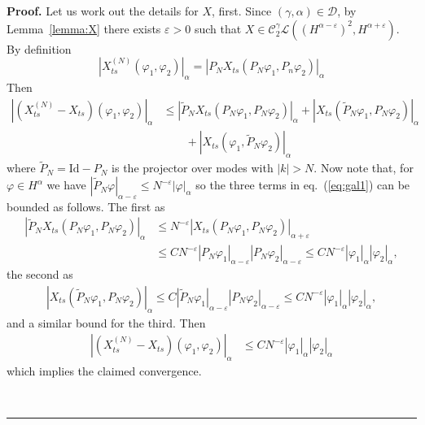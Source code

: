 \documentclass[a4paper,11pt,reqno]{article}
\newcommand{\eps}{\varepsilon}
\newcommand{\CC}{\mathcal{C}}
\newcommand{\DD}{\mathcal{D}}
\newcommand{\LL}{\mathcal{L}}
\newcommand{\wt}{\widetilde}
\newenvironment{proof}[1][Proof]{\textbf{#1.} }{\ \rule{0.5em}{0.5em}}
\begin{document}
\begin{proof}
Let us work out the details for $X$, first.
Since $(\gamma,\alpha) \in \DD$, by Lemma~\ref{lemma:X} there exists $\eps > 0$ such that $X \in \CC_2^\gamma \LL((H^{\alpha-\eps})^2,H^{\alpha+\eps})$.
By definition
$$
|X^{(N)}_{ts}(\varphi_1,\varphi_2)|_{\alpha} = | P_N  X_{ts}(P_N \varphi_1, P_n \varphi_2)|_\alpha
$$  
Then
\begin{equation}
\label{eq:gal1}
  \begin{split}
 | (X^{(N)}_{ts}-X_{ts})(\varphi_1,\varphi_2)|_{\alpha} & \le 
|\wt P_N X_{ts}(P_N \varphi_1,P_N \varphi_2)|_\alpha + |X_{ts}(\wt P_N \varphi_1,P_N \varphi_2)|_\alpha 
\\ & \qquad + |X_{ts}( \varphi_1,\wt P_N \varphi_2)|_\alpha 
  \end{split}
\end{equation}
where $\wt P_N = \text{Id}-P_N$ is the projector over modes with $|k| > N$. Now note that, for $\varphi \in H^{\alpha}$ we have 
$
|\wt P_N \varphi|_{\alpha-\eps} \le N^{-\eps} |\varphi|_\alpha
$
so the three terms in eq.~(\ref{eq:gal1}) can be bounded as follows.
The first as
\begin{equation*}
  \begin{split}
|\wt P_N X_{ts}(P_N \varphi_1,P_N \varphi_2)|_\alpha & \le N^{-\eps} |X_{ts}(P_N \varphi_1,P_N \varphi_2)|_{\alpha+\eps} 
\\ & \le C N^{-\eps} |P_N \varphi_1|_{\alpha-\eps} |P_N \varphi_2|_{\alpha-\eps}   
\le C N^{-\eps} |\varphi_1|_{\alpha} |\varphi_2|_{\alpha}     ,  
  \end{split}
\end{equation*}
the second as
\begin{equation*}
  \begin{split}
|X_{ts}(\wt P_N \varphi_1,P_N \varphi_2)|_\alpha  \le C  |\wt P_N \varphi_1|_{\alpha-\eps} |P_N \varphi_2|_{\alpha-\eps} 
 \le C  N^{-\eps} |\varphi_1|_{\alpha} |\varphi_2|_{\alpha} ,
  \end{split}
\end{equation*}
 and a similar bound for the third.
Then
\begin{equation}
\label{eq:gal2}
  \begin{split}
 | (X^{(N)}_{ts}-X_{ts})(\varphi_1,\varphi_2)|_{\alpha} & \le C N^{-\eps} |\varphi_1|_{\alpha} |\varphi_2|_{\alpha}
  \end{split}
\end{equation}
which implies the claimed convergence.


\end{proof}
\end{document}

